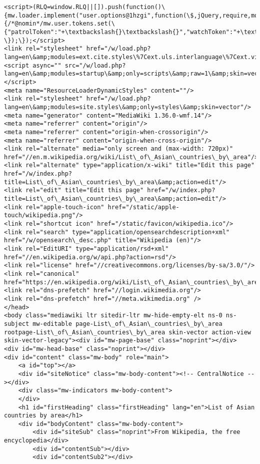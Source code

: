 \documentclass[11pt]{article}
\begin{document}
\begin{Verbatim}[commandchars=\\\{\}]
<script>(RLQ=window.RLQ||[]).push(function()\{mw.loader.implement("user.options@1hzgi",function(\$,jQuery,require,module)\{/*@nomin*/mw.user.tokens.set(\{"patrolToken":"+\textbackslash{}\textbackslash{}","watchToken":"+\textbackslash{}\textbackslash{}","csrfToken":"+\textbackslash{}\textbackslash{}"\});
\});\});</script>
<link rel="stylesheet" href="/w/load.php?lang=en\&amp;modules=ext.cite.styles\%7Cext.uls.interlanguage\%7Cext.visualEditor.desktopArticleTarget.noscript\%7Cext.wikimediaBadges\%7Cjquery.makeCollapsible.styles\%7Cjquery.tablesorter.styles\%7Cskins.vector.styles.legacy\%7Cwikibase.client.init\&amp;only=styles\&amp;skin=vector"/>
<script async="" src="/w/load.php?lang=en\&amp;modules=startup\&amp;only=scripts\&amp;raw=1\&amp;skin=vector"></script>
<meta name="ResourceLoaderDynamicStyles" content=""/>
<link rel="stylesheet" href="/w/load.php?lang=en\&amp;modules=site.styles\&amp;only=styles\&amp;skin=vector"/>
<meta name="generator" content="MediaWiki 1.36.0-wmf.14"/>
<meta name="referrer" content="origin"/>
<meta name="referrer" content="origin-when-crossorigin"/>
<meta name="referrer" content="origin-when-cross-origin"/>
<link rel="alternate" media="only screen and (max-width: 720px)" href="//en.m.wikipedia.org/wiki/List\_of\_Asian\_countries\_by\_area"/>
<link rel="alternate" type="application/x-wiki" title="Edit this page" href="/w/index.php?title=List\_of\_Asian\_countries\_by\_area\&amp;action=edit"/>
<link rel="edit" title="Edit this page" href="/w/index.php?title=List\_of\_Asian\_countries\_by\_area\&amp;action=edit"/>
<link rel="apple-touch-icon" href="/static/apple-touch/wikipedia.png"/>
<link rel="shortcut icon" href="/static/favicon/wikipedia.ico"/>
<link rel="search" type="application/opensearchdescription+xml" href="/w/opensearch\_desc.php" title="Wikipedia (en)"/>
<link rel="EditURI" type="application/rsd+xml" href="//en.wikipedia.org/w/api.php?action=rsd"/>
<link rel="license" href="//creativecommons.org/licenses/by-sa/3.0/"/>
<link rel="canonical" href="https://en.wikipedia.org/wiki/List\_of\_Asian\_countries\_by\_area"/>
<link rel="dns-prefetch" href="//login.wikimedia.org"/>
<link rel="dns-prefetch" href="//meta.wikimedia.org" />
</head>
<body class="mediawiki ltr sitedir-ltr mw-hide-empty-elt ns-0 ns-subject mw-editable page-List\_of\_Asian\_countries\_by\_area rootpage-List\_of\_Asian\_countries\_by\_area skin-vector action-view skin-vector-legacy"><div id="mw-page-base" class="noprint"></div>
<div id="mw-head-base" class="noprint"></div>
<div id="content" class="mw-body" role="main">
	<a id="top"></a>
	<div id="siteNotice" class="mw-body-content"><!-- CentralNotice --></div>
	<div class="mw-indicators mw-body-content">
	</div>
	<h1 id="firstHeading" class="firstHeading" lang="en">List of Asian countries by area</h1>
	<div id="bodyContent" class="mw-body-content">
		<div id="siteSub" class="noprint">From Wikipedia, the free encyclopedia</div>
		<div id="contentSub"></div>
		<div id="contentSub2"></div>
		

\end{Verbatim}
\end{document}
